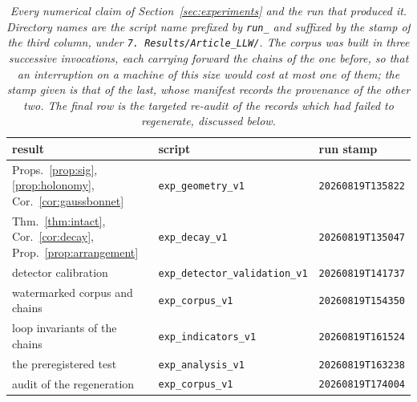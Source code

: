 \documentclass{article}
\theoremstyle{plain}
\theoremstyle{definition}
\numberwithin{equation}{section}
\begin{document}
\begin{table}[t]
\centering
\small
\begin{tabular}{lll}
\toprule
result & script & run stamp\\
\midrule
Props.~\ref{prop:sig}, \ref{prop:holonomy}, Cor.~\ref{cor:gaussbonnet}
  & \texttt{exp\_geometry\_v1} & \texttt{20260819T135822}\\
Thm.~\ref{thm:intact}, Cor.~\ref{cor:decay}, Prop.~\ref{prop:arrangement}
  & \texttt{exp\_decay\_v1} & \texttt{20260819T135047}\\
detector calibration
  & \texttt{exp\_detector\_validation\_v1} & \texttt{20260819T141737}\\
watermarked corpus and chains
  & \texttt{exp\_corpus\_v1} & \texttt{20260819T154350}\\
loop invariants of the chains
  & \texttt{exp\_indicators\_v1} & \texttt{20260819T161524}\\
the preregistered test
  & \texttt{exp\_analysis\_v1} & \texttt{20260819T163238}\\
audit of the regeneration
  & \texttt{exp\_corpus\_v1} & \texttt{20260819T174004}\\
\bottomrule
\end{tabular}
\caption{\emph{Every numerical claim of Section~\ref{sec:experiments}
and the run that produced it. Directory names are the script name
prefixed by \texttt{run\_} and suffixed by the stamp of the third
column, under \texttt{7.~Results/Article\_LLW/}. The corpus was built in
three successive invocations, each carrying forward the chains of the
one before, so that an interruption on a machine of this size would cost
at most one of them; the stamp given is that of the last, whose manifest
records the provenance of the other two. The final row is the targeted
re-audit of the records which had failed to regenerate, discussed
below.}}
\label{tab:runs}
\end{table}
\end{document}
